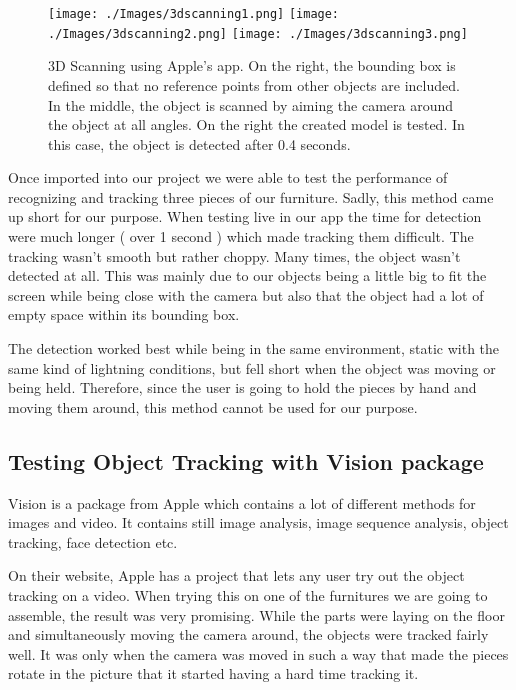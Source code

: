\begin{figure}[hbtp]
\begin{center}
\texttt{[image: ./Images/3dscanning1.png]}
\texttt{[image: ./Images/3dscanning2.png]}
\texttt{[image: ./Images/3dscanning3.png]} 
\caption{3D Scanning using Apple's app. On the right, the bounding box is defined so that no reference points from other objects are included. In the middle, the object is scanned by aiming the camera around the object at all angles. On the right the created model is tested. In this case, the object is detected after 0.4 seconds.}
\end{center}
\end{figure}

Once imported into our project we were able to test the performance of recognizing and tracking three pieces of our furniture.
Sadly, this method came up short for our purpose. When testing live in our app the time for detection were much longer ( over 1 second ) which made tracking them difficult. The tracking wasn't smooth but rather choppy. Many times, the object wasn't detected at all. This was mainly due to our objects being a little big to fit the screen while being close with the camera but also that the object had a lot of empty space within its bounding box.

The detection worked best while being in the same environment, static with the same kind of lightning conditions, but fell short when the object was moving or being held. Therefore, since the user is going to hold the pieces by hand and moving them around, this method cannot be used for our purpose.

\subsection{Testing Object Tracking with Vision package}
Vision is a package from Apple which contains a lot of different methods for images and video. It contains still image analysis, image sequence analysis, object tracking, face detection etc.

On their website, Apple has a project that lets any user try out the object tracking on a video. When trying this on one of the furnitures we are going to assemble, the result was very promising. While the parts were laying on the floor and simultaneously moving the camera around, the objects were tracked fairly well. It was only when the camera was moved in such a way that made the pieces rotate in the picture that it started having a hard time tracking it.

